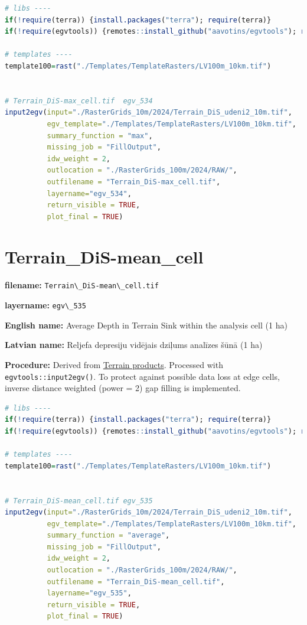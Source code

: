 \documentclass[
]{book}
\newcommand{\passthrough}[1]{#1}
\begin{document}
\begin{lstlisting}[language=R]
# libs ----
if(!require(terra)) {install.packages("terra"); require(terra)}
if(!require(egvtools)) {remotes::install_github("aavotins/egvtools"); require(egvtools)}

# templates ----
template100=rast("./Templates/TemplateRasters/LV100m_10km.tif")


# Terrain_DiS-max_cell.tif  egv_534
input2egv(input="./RasterGrids_10m/2024/Terrain_DiS_udeni2_10m.tif",
          egv_template="./Templates/TemplateRasters/LV100m_10km.tif",
          summary_function = "max",
          missing_job = "FillOutput",
          idw_weight = 2,
          outlocation = "./RasterGrids_100m/2024/RAW/",
          outfilename = "Terrain_DiS-max_cell.tif",
          layername="egv_534",
          return_visible = TRUE,
          plot_final = TRUE)
\end{lstlisting}

\section{Terrain\_DiS-mean\_cell}\label{ch06.535}

\textbf{filename:} \passthrough{\lstinline!Terrain\_DiS-mean\_cell.tif!}

\textbf{layername:} \passthrough{\lstinline!egv\_535!}

\textbf{English name:} Average Depth in Terrain Sink within the analysis cell (1 ha)

\textbf{Latvian name:} Reljefa depresiju vidējais dziļums analīzes šūnā (1 ha)

\textbf{Procedure:} Derived from \hyperref[Ch05.01]{Terrain products}. Processed
with \passthrough{\lstinline!egvtools::input2egv()!}. To protect against
possible data loss at edge cells, inverse distance weighted (power = 2) gap filling
is implemented.

\begin{lstlisting}[language=R]
# libs ----
if(!require(terra)) {install.packages("terra"); require(terra)}
if(!require(egvtools)) {remotes::install_github("aavotins/egvtools"); require(egvtools)}

# templates ----
template100=rast("./Templates/TemplateRasters/LV100m_10km.tif")


# Terrain_DiS-mean_cell.tif egv_535
input2egv(input="./RasterGrids_10m/2024/Terrain_DiS_udeni2_10m.tif",
          egv_template="./Templates/TemplateRasters/LV100m_10km.tif",
          summary_function = "average",
          missing_job = "FillOutput",
          idw_weight = 2,
          outlocation = "./RasterGrids_100m/2024/RAW/",
          outfilename = "Terrain_DiS-mean_cell.tif",
          layername="egv_535",
          return_visible = TRUE,
          plot_final = TRUE)
\end{lstlisting}
\end{document}
